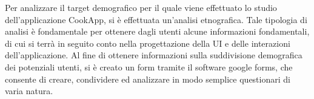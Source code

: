 Per analizzare il target demografico per il quale viene effettuato lo studio dell'applicazione CookApp, 
si è effettuata un'analisi etnografica. Tale tipologia di analisi è fondamentale per ottenere dagli utenti
alcune informazioni fondamentali, di cui si terrà in seguito conto nella progettazione della UI e delle interazioni 
dell'applicazione. Al fine di ottenere informazioni sulla suddivisione demografica dei potenziali utenti, si è creato
un form tramite il software google forms\cite{GoogleModules}, che consente di creare, condividere ed analizzare in modo semplice
questionari di varia natura.
